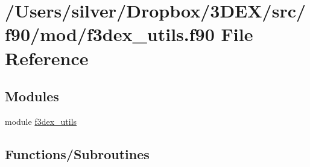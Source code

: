 \hypertarget{f3dex__utils_8f90}{
\section{/Users/silver/Dropbox/3DEX/src/f90/mod/f3dex\_\-utils.f90 File Reference}
\label{f3dex__utils_8f90}
}
\subsection*{Modules}
\begin{DoxyCompactItemize}
\item 
module \hyperlink{namespacef3dex__utils}{f3dex\_\-utils}
\end{DoxyCompactItemize}
\subsection*{Functions/Subroutines}
